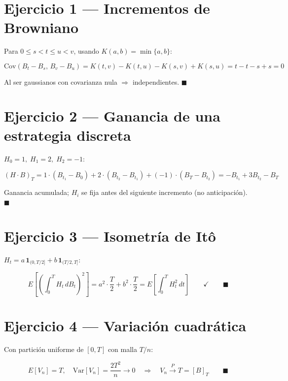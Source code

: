 \documentclass[12pt,letterpaper]{article}
\begin{document}
\section*{Ejercicio 1 --- Incrementos de Browniano}

Para $0 \leq s < t \leq u < v$, usando $K(a,b)=\min\{a,b\}$:

\[
  \mathrm{Cov}(B_t-B_s,\, B_v-B_u) = K(t,v)-K(t,u)-K(s,v)+K(s,u)
  = t - t - s + s = 0
\]

Al ser gaussianos con covarianza nula $\Rightarrow$ independientes. $\blacksquare$

\section*{Ejercicio 2 --- Ganancia de una estrategia discreta}

$H_0=1,\; H_1=2,\; H_2=-1$:

\[
  (H\cdot B)_T = 1\cdot(B_{t_1}-B_0) + 2\cdot(B_{t_2}-B_{t_1})
    + (-1)\cdot(B_T-B_{t_2}) = -B_{t_1} + 3B_{t_2} - B_T
\]

Ganancia acumulada; $H_i$ se fija antes del siguiente incremento
(no anticipaci\'on). $\blacksquare$

\section*{Ejercicio 3 --- Isometr\'ia de It\^o}

$H_t = a\,\mathbf{1}_{(0,T/2]} + b\,\mathbf{1}_{(T/2,T]}$:

\[
  E\!\left[\!\left(\int_0^T H_t\,dB_t\right)^{\!2}\right]
  = a^2\cdot\frac{T}{2} + b^2\cdot\frac{T}{2}
  = E\!\left[\int_0^T H_t^2\,dt\right] \qquad \checkmark \qquad \blacksquare
\]

\section*{Ejercicio 4 --- Variaci\'on cuadr\'atica}

Con partici\'on uniforme de $[0,T]$ con malla $T/n$:

\[
  E[V_n] = T, \quad
  \mathrm{Var}[V_n] = \frac{2T^2}{n} \to 0
  \quad \Rightarrow \quad V_n \xrightarrow{P} T = [B]_T \qquad \blacksquare
\]
\end{document}
